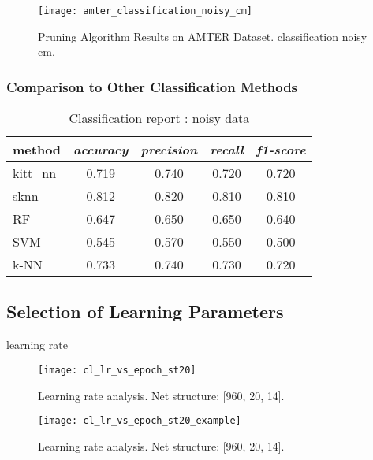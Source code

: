 \begin{figure}[H]
  \centering
  \texttt{[image: amter\_classification\_noisy\_cm]}
  \caption{Pruning Algorithm Results on AMTER Dataset. classification noisy cm.}
  \label{fig:amter_cm_noisy}
\end{figure}


\subsubsection{Comparison to Other Classification Methods}

\begin{table}[H]
\centering
\caption{Classification report : noisy data}
\label{tab:classification_report_noisy}
\begin{tabular}{|l|c|c|c|c|} 
\hline
method & \textit{accuracy} & \textit{precision} & \textit{recall} & \textit{f1-score} \\
\hline \hline
   kitt\_nn &       0.719 &      0.740 &      0.720 &   0.720\\ \hline
   sknn     &       0.812 &      0.820 &      0.810 &   0.810\\ \hline
   RF       &       0.647 &      0.650 &      0.650 &   0.640\\ \hline
   SVM      &       0.545 &      0.570 &      0.550 &   0.500\\ \hline
   k-NN     &       0.733 &      0.740 &      0.730 &   0.720\\ \hline
\hline
\end{tabular}
\end{table}

\subsection{Selection of Learning Parameters} \label{ssec:selection_of_learning_parameters}

learning rate

\begin{figure}[H]
  \centering
  \texttt{[image: cl\_lr\_vs\_epoch\_st20]}
  \caption{Learning rate analysis. Net structure: [960, 20, 14].}
  \label{fig:lr_analysis}
\end{figure}

\begin{figure}[H]
  \centering
  \texttt{[image: cl\_lr\_vs\_epoch\_st20\_example]}
  \caption{Learning rate analysis. Net structure: [960, 20, 14].}
  \label{fig:lr_analysis_example}
\end{figure}

